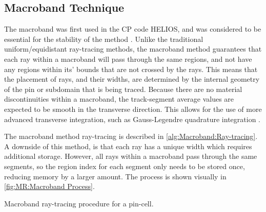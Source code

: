 {{    \subsection{Macroband Technique}{\label{ssec:MR:Macroband Technique}
      The macroband was first used in the \acf{CP} code HELIOS, and was considered to be essential for the stability of the method \cite{Villarino1992}.
      Unlike the traditional uniform/equidistant ray-tracing methods, the macroband method guarantees that each ray within a macroband will pass through the same regions, and not have any regions within its' bounds that are not crossed by the rays.
      This means that the placement of rays, and their widths, are determined by the internal geometry of the pin or subdomain that is being traced.
      Because there are no material discontinuities within a macroband, the track-segment average values are expected to be smooth in the transverse direction.
      This allows for the use of more advanced transverse integration, such as Gauss-Legendre quadrature integration \cite{Yamamoto2005}.

      The macroband method ray-tracing is described in \cref{alg:Macroband:Ray-tracing}.
      A downside of this method, is that each ray has a unique width which requires additional storage.
      However, all rays within a macroband pass through the same segments, so the region index for each segment only needs to be stored once, reducing memory by a larger amount.
      The process is shown visually in \cref{fig:MR:Macroband Process}.

      \begin{algorithm}[ht]
        \centering
        \caption{Macroband ray-tracing procedure for a pin-cell.\label{alg:Macroband:Ray-tracing}}
        \begin{algorithmic}[1]
          \EndFor
        \end{algorithmic}
      \end{algorithm}

}}}
